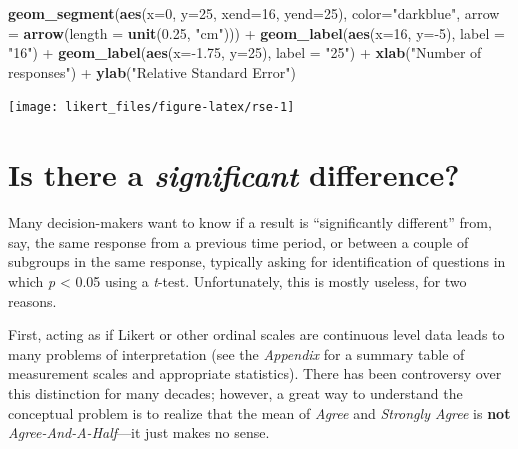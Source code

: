 \documentclass[]{book}
\newenvironment{Shaded}{\begin{snugshade}}{\end{snugshade}}
\newcommand{\KeywordTok}[1]{\textcolor[rgb]{0.13,0.29,0.53}{\textbf{{#1}}}}
\newcommand{\DataTypeTok}[1]{\textcolor[rgb]{0.13,0.29,0.53}{{#1}}}
\newcommand{\DecValTok}[1]{\textcolor[rgb]{0.00,0.00,0.81}{{#1}}}
\newcommand{\FloatTok}[1]{\textcolor[rgb]{0.00,0.00,0.81}{{#1}}}
\newcommand{\StringTok}[1]{\textcolor[rgb]{0.31,0.60,0.02}{{#1}}}
\newcommand{\NormalTok}[1]{{#1}}
\begin{document}
\begin{Shaded}
\begin{Highlighting}[]
\StringTok{  }\KeywordTok{geom_segment}\NormalTok{(}\KeywordTok{aes}\NormalTok{(}\DataTypeTok{x=}\DecValTok{0}\NormalTok{, }\DataTypeTok{y=}\DecValTok{25}\NormalTok{, }\DataTypeTok{xend=}\DecValTok{16}\NormalTok{, }\DataTypeTok{yend=}\DecValTok{25}\NormalTok{), }\DataTypeTok{color=}\StringTok{"darkblue"}\NormalTok{, }\DataTypeTok{arrow =} \KeywordTok{arrow}\NormalTok{(}\DataTypeTok{length =} \KeywordTok{unit}\NormalTok{(}\FloatTok{0.25}\NormalTok{, }\StringTok{"cm"}\NormalTok{))) +}
\StringTok{  }\KeywordTok{geom_label}\NormalTok{(}\KeywordTok{aes}\NormalTok{(}\DataTypeTok{x=}\DecValTok{16}\NormalTok{, }\DataTypeTok{y=}\NormalTok{-}\DecValTok{5}\NormalTok{), }\DataTypeTok{label =} \StringTok{"16"}\NormalTok{) +}
\StringTok{  }\KeywordTok{geom_label}\NormalTok{(}\KeywordTok{aes}\NormalTok{(}\DataTypeTok{x=}\NormalTok{-}\FloatTok{1.75}\NormalTok{, }\DataTypeTok{y=}\DecValTok{25}\NormalTok{), }\DataTypeTok{label =} \StringTok{"25"}\NormalTok{) +}
\StringTok{  }\KeywordTok{xlab}\NormalTok{(}\StringTok{"Number of responses"}\NormalTok{) +}
\StringTok{  }\KeywordTok{ylab}\NormalTok{(}\StringTok{"Relative Standard Error"}\NormalTok{)}
\end{Highlighting}
\end{Shaded}

\begin{center}\texttt{[image: likert\_files/figure-latex/rse-1]} \end{center}

\chapter{\texorpdfstring{Is there a \emph{significant}
difference?}{Is there a significant difference?}}\label{is-there-a-significant-difference}

Many decision-makers want to know if a result is ``significantly
different'' from, say, the same response from a previous time period, or
between a couple of subgroups in the same response, typically asking for
identification of questions in which \emph{p} \textless{} 0.05 using a
\emph{t}-test. Unfortunately, this is mostly useless, for two reasons.

First, acting as if Likert or other ordinal scales are continuous level
data leads to many problems of interpretation (see the \emph{Appendix}
for a summary table of measurement scales and appropriate statistics).
There has been controversy over this distinction for many decades;
however, a great way to understand the conceptual problem is to realize
that the mean of \emph{Agree} and \emph{Strongly Agree} is \textbf{not}
\emph{Agree-And-A-Half}---it just makes no sense.
\end{document}

